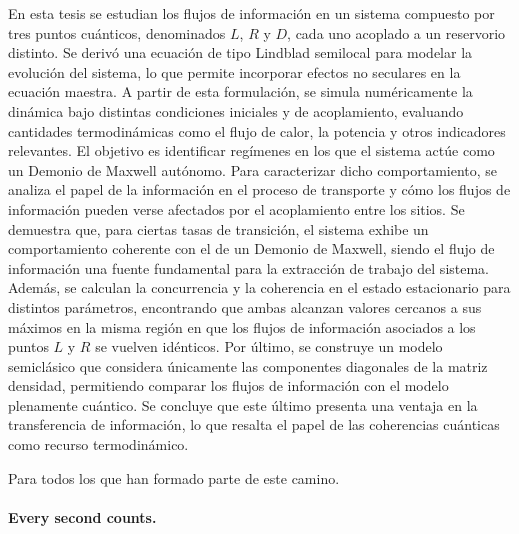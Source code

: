 \documentclass[
	spanish, %
	letterpaper, oneside
]{book}
\begin{document}
\templatePortrait

\templatePagecfg

\begin{abstractd}
En esta tesis se estudian los flujos de información en un sistema compuesto por tres puntos cuánticos, denominados \( L \), \( R \) y \( D \), cada uno acoplado a un reservorio distinto. Se derivó una ecuación de tipo Lindblad semilocal para modelar la evolución del sistema, lo que permite incorporar efectos no seculares en la ecuación maestra. A partir de esta formulación, se simula numéricamente la dinámica bajo distintas condiciones iniciales y de acoplamiento, evaluando cantidades termodinámicas como el flujo de calor, la potencia y otros indicadores relevantes. El objetivo es identificar regímenes en los que el sistema actúe como un Demonio de Maxwell autónomo. Para caracterizar dicho comportamiento, se analiza el papel de la información en el proceso de transporte y cómo los flujos de información pueden verse afectados por el acoplamiento entre los sitios. Se demuestra que, para ciertas tasas de transición, el sistema exhibe un comportamiento coherente con el de un Demonio de Maxwell, siendo el flujo de información una fuente fundamental para la extracción de trabajo del sistema. Además, se calculan la concurrencia y la coherencia en el estado estacionario para distintos parámetros, encontrando que ambas alcanzan valores cercanos a sus máximos en la misma región en que los flujos de información asociados a los puntos \( L \) y \( R \) se vuelven idénticos. Por último, se construye un modelo semiclásico que considera únicamente las componentes diagonales de la matriz densidad, permitiendo comparar los flujos de información con el modelo plenamente cuántico. Se concluye que este último presenta una ventaja en la transferencia de información, lo que resalta el papel de las coherencias cuánticas como recurso termodinámico.
\end{abstractd}


\begin{dedicatory}
	Para todos los que han formado parte de este camino.\\
	~ \\
	\textbf{Every second counts.}
\end{dedicatory}
\end{document}
